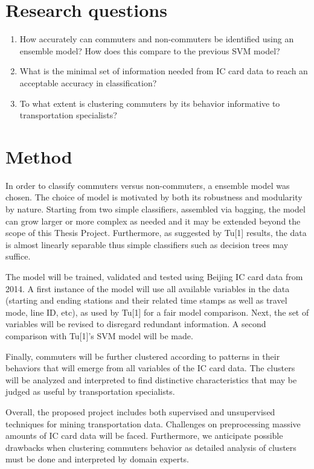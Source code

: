 \documentclass{article}
\begin{document}
\section{Research questions}

\begin{enumerate}
\item How accurately can commuters and non-commuters be identified using an ensemble model? How does this compare to the previous SVM model?
\item What is the minimal set of information needed from IC card data to reach an acceptable accuracy in classification?
\item To what extent is clustering commuters by its behavior informative to transportation specialists? 
\end{enumerate}

\section{Method}
In order to classify commuters versus non-commuters, a ensemble model was chosen. The choice of model is motivated by both its robustness and modularity by nature. Starting from two simple classifiers, assembled via bagging, the model can grow larger or more complex as needed and it may be extended beyond the scope of this Thesis Project. Furthermore, as suggested by Tu[1] results, the data is almost linearly separable thus simple classifiers such as decision trees may suffice. 

The model will be trained, validated and tested using Beijing IC card data from 2014. A first instance of the model will use all available variables in the data (starting and ending stations and their related time stamps as well as travel mode, line ID, etc), as used by Tu[1] for a fair model comparison. Next, the set of variables will be revised to disregard redundant information. A second comparison with Tu[1]'s SVM model will be made. 

Finally, commuters will be further clustered according to patterns in their behaviors that will emerge from all variables of the IC card data. The clusters will be analyzed and interpreted to find distinctive characteristics that may be judged as useful by transportation specialists. 

Overall, the proposed project includes both supervised and unsupervised techniques for mining transportation data. Challenges on preprocessing massive amounts of IC card data will be faced. Furthermore, we anticipate possible drawbacks when clustering commuters behavior as detailed analysis of clusters must be done and interpreted by domain experts. 
\end{document}
